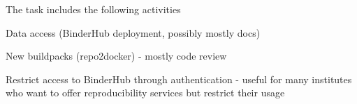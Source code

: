 \begin{task}[
  title=Support more use patterns,
  id=patterns,
  lead=SRL,
  PM=1,
  wphases={0-36},
  partners={MP}
]
  The task includes the following activities
  \begin{compactitem}
  \item Data access (BinderHub deployment, possibly mostly docs)
  \item New buildpacks (repo2docker) - mostly code review
  \item Restrict access to BinderHub through authentication
    - useful for many institutes who want to offer reproducibility services but
    restrict their usage
  \end{compactitem}
\end{task}
